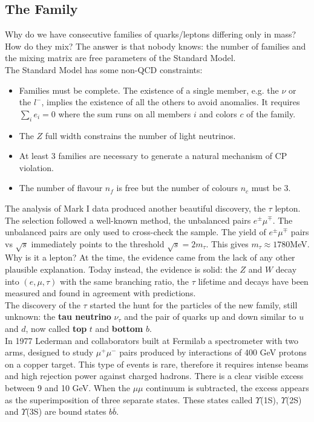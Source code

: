 \documentclass[10.75pt,a4paper,openright,bottom=2cm]{article}
\begin{document}
\subsection{The  Family}
Why do we have consecutive families of quarks/leptons differing only in mass? How do they mix? The answer is that nobody knows: the number of families and the mixing matrix are free parameters of the Standard Model.\\
The Standard Model has some non-QCD constraints:
\begin{itemize}
    \item Families must be complete. The existence of a single member, e.g. the $\nu$ or the $l^-$, implies the existence of all the others to avoid anomalies. It requires $\sum_ie_i=0$ where the sum runs on all members $i$ and colors $c$ of the family.
    \item The $Z$ full width constrains the number of light neutrinos.
    \item At least 3 families are necessary to generate a natural mechanism of CP violation.
    \item The number of flavour $n_f$ is free but the number of colours $n_c$ must be 3.
\end{itemize}
The analysis of Mark I data produced another beautiful discovery, the $\tau$ lepton. The selection followed a well-known method, the unbalanced pairs $e^\pm\mu^\mp$. The unbalanced pairs are only used to cross-check the sample. The yield of $e^\pm\mu^\mp$ pairs vs $\sqrt{s}$ immediately points to the threshold $\sqrt{s}=2m_\tau$. This gives $m_\tau\approx1780$\;MeV.\\
Why is it a lepton? At the time, the evidence came from the lack of any other plausible explanation. Today instead, the evidence is solid: the $Z$ and $W$ decay into $(e,\mu,\tau)$ with the same branching ratio, the $\tau$ lifetime and decays have been measured and found in agreement with predictions.\\
The discovery of the $\tau$ started the hunt for the particles of the new family, still unknown: the \textbf{tau neutrino} $\nu_\tau$ and the pair of quarks up and down similar to $u$ and $d$, now called \textbf{top} $t$ and \textbf{bottom} $b$.\\
In 1977 Lederman and collaborators built at Fermilab a spectrometer with two arms, designed to study $\mu^+\mu^-$ pairs produced by interactions of 400 GeV protons on a copper target. This type of events is rare, therefore it requires intense beams and high rejection power against charged hadrons. There is a clear visible excess between 9 and 10 GeV. When the $\mu\mu$ continuum is subtracted, the excess appears as the superimposition of three separate states. These states called $\Upsilon$(1S), $\Upsilon$(2S) and $\Upsilon$(3S) are bound states $b\overline{b}$.\\
\end{document}
